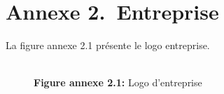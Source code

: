 \section*{Annexe 2.~Entreprise}


La figure annexe 2.1 présente le logo entreprise.
\begin{figure}[htpb]
    \centering
    {\\\textbf{Figure annexe 2.1:} Logo d'entreprise}
\end{figure}

